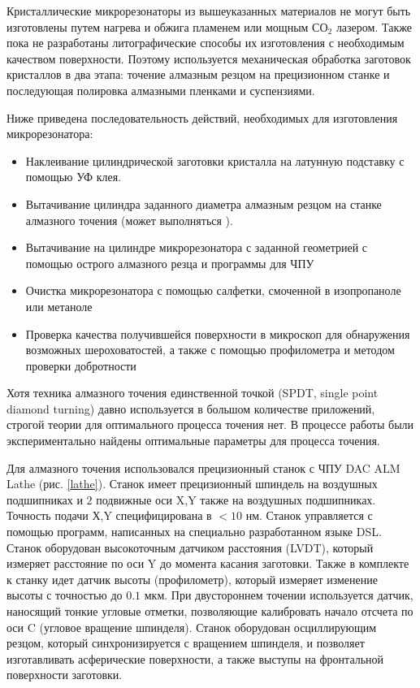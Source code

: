 Кристаллические микрорезонаторы из вышеуказанных материалов не могут быть изготовлены путем нагрева и обжига пламенем или мощным $СО_2$ лазером. Также пока не разработаны литографические способы их изготовления с необходимым качеством поверхности. Поэтому используется механическая обработка заготовок кристаллов в два этапа: точение алмазным резцом на прецизионном станке и последующая полировка алмазными пленками и суспензиями.

Ниже приведена последовательность действий, необходимых для изготовления микрорезонатора:

\begin{itemize}
  \item Наклеивание цилиндрической заготовки кристалла на латунную подставку с помощью УФ клея.
  \item Вытачивание цилиндра заданного диаметра алмазным резцом на станке алмазного точения (может выполняться ).
  \item Вытачивание на цилиндре микрорезонатора с заданной геометрией с помощью острого алмазного резца и программы для ЧПУ
  \item Очистка микрорезонатора с помощью салфетки, смоченной в изопропаноле или метаноле
  \item Проверка качества получившейся поверхности в микроскоп для обнаружения возможных шероховатостей, а также с помощью профилометра и методом проверки добротности
\end{itemize}

Хотя техника алмазного точения единственной точкой (SPDT, single point diamond turning) давно используется в большом количестве приложений, строгой теории для оптимального процесса точения нет. В процессе работы были экспериментально найдены оптимальные параметры для процесса точения.

Для алмазного точения использовался прецизионный станок с ЧПУ DAC ALM Lathe (рис. \ref{lathe}). Станок имеет прецизионный шпиндель на воздушных подшипниках и $2$ подвижные оси X,Y также на воздушных подшипниках. Точность подачи Х,Y специфицирована в $<10$ нм. Станок управляется с помощью программ, написанных на специально разработанном языке DSL. Станок оборудован высокоточным датчиком расстояния (LVDT), который измеряет расстояние по оси Y до момента касания заготовки. Также в комплекте к станку идет датчик высоты (профилометр), который измеряет изменение высоты с точностью до $0.1$ мкм. При двустороннем точении используется датчик, наносящий тонкие угловые отметки, позволяющие калибровать начало отсчета по оси C (угловое вращение шпинделя). Станок оборудован осциллирующим резцом, который синхронизируется с вращением шпинделя, и позволяет изготавливать асферические поверхности, а также выступы на фронтальной поверхности заготовки.

